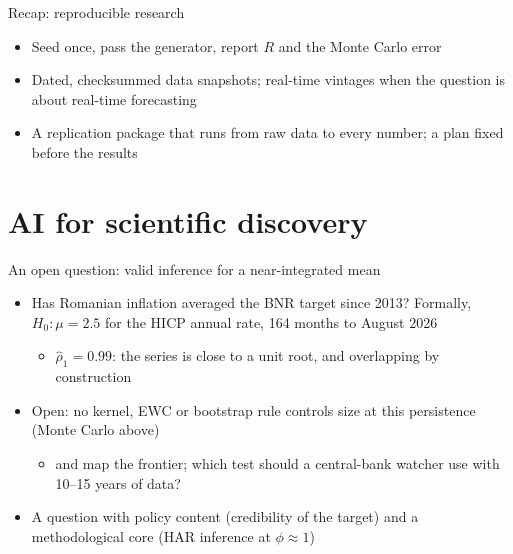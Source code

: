 \begin{frame}{Recap: reproducible research}
\itemsize{\small}
\begin{itemize}
    \item Seed once, pass the generator, report $R$ and the Monte Carlo error
    \item Dated, checksummed data snapshots; real-time vintages when the question is about real-time forecasting
    \item A replication package that runs from raw data to every number; a plan fixed before the results
\end{itemize}
\end{frame}


\section{AI for scientific discovery}

\begin{frame}{An open question: valid inference for a near-integrated mean}
\itemsize{\small}
\begin{itemize}
    \item Has Romanian inflation averaged the BNR target since 2013? Formally, $H_0: \mu = 2.5$ for the HICP annual rate, 164 months to August 2026
    \begin{itemize}
        \item $\hat\rho_1 = 0.99$: the series is close to a unit root, and overlapping by construction
    \end{itemize}
    \item Open: no kernel, EWC or bootstrap rule controls size at this persistence (Monte Carlo above)
    \begin{itemize}
        \item {} and  map the frontier; which test should a central-bank watcher use with 10--15 years of data?
    \end{itemize}
    \item A question with policy content (credibility of the target) and a methodological core (HAR inference at $\phi \approx 1$)
\end{itemize}
\end{frame}

